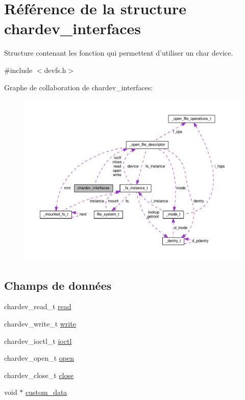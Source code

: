 \hypertarget{structchardev__interfaces}{\section{Référence de la structure chardev\+\_\+interfaces}
\label{structchardev__interfaces}
}


Structure contenant les fonction qui permettent d'utiliser un char device.  




{\ttfamily \#include $<$devfs.\+h$>$}



Graphe de collaboration de chardev\+\_\+interfaces\+:
\nopagebreak
\begin{figure}[H]
\begin{center}
\leavevmode
\includegraphics[width=350pt]{structchardev__interfaces__coll__graph}
\end{center}
\end{figure}
\subsection*{Champs de données}
\begin{DoxyCompactItemize}
\item 
chardev\+\_\+read\+\_\+t \hyperlink{structchardev__interfaces_afeba560360e6a5dfff549d78c220b68b}{read}
\item 
chardev\+\_\+write\+\_\+t \hyperlink{structchardev__interfaces_a6f70961f2f888de24d500d50bae85a3f}{write}
\item 
chardev\+\_\+ioctl\+\_\+t \hyperlink{structchardev__interfaces_a9e5903e31e8e5ab21e9abc4b3a844e4a}{ioctl}
\item 
chardev\+\_\+open\+\_\+t \hyperlink{structchardev__interfaces_a7962a67531ea5263a2f837c36fb18dc0}{open}
\item 
chardev\+\_\+close\+\_\+t \hyperlink{structchardev__interfaces_a9cba421c4dddc041e4b5029d011dbbd9}{close}
\item 
void $\ast$ \hyperlink{structchardev__interfaces_a9b6b938d76fe7e20c93da8a032a42ad7}{custom\+\_\+data}
\end{DoxyCompactItemize}


